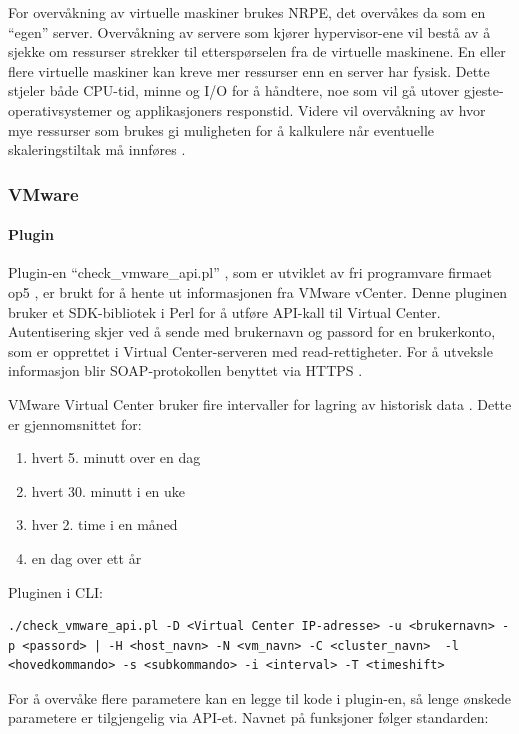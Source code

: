 For overvåkning av virtuelle maskiner brukes NRPE, det overvåkes da som en ``egen'' server. Overvåkning av servere som kjører hypervisor-ene vil bestå av å sjekke om ressurser strekker til etterspørselen fra de virtuelle maskinene. En eller flere virtuelle maskiner kan kreve mer ressurser enn en server har fysisk. Dette stjeler både CPU-tid, minne og I/O for å håndtere, noe som vil gå utover gjeste-operativsystemer og applikasjoners responstid. Videre vil overvåkning av hvor mye ressurser som brukes gi muligheten for å kalkulere når eventuelle skaleringstiltak må innføres \cite{vmwaremonitoring}.

\subsubsection{VMware}
\paragraph{Plugin}
Plugin-en ``check\_vmware\_api.pl'' , som er utviklet av fri programvare firmaet op5 \cite{op5}, er brukt for å hente ut informasjonen fra VMware vCenter. Denne pluginen bruker et SDK-bibliotek i Perl \cite{vmwareperl} for å utføre API-kall til Virtual Center. Autentisering skjer ved å sende med brukernavn og passord for en brukerkonto, som er opprettet i Virtual Center-serveren med read-rettigheter. For å utveksle informasjon blir SOAP-protokollen benyttet \cite{wiki:soap} via HTTPS \cite{ciscovirtual}.

VMware Virtual Center bruker fire intervaller for lagring av historisk data \cite{vmwareperf}. Dette er gjennomsnittet for:
\begin{enumerate}
        \item hvert 5. minutt over en dag
        \item hvert 30. minutt i en uke
        \item hver 2. time i en måned
        \item en dag over ett år
\end{enumerate}

Pluginen i CLI:
\begin{lstlisting}[style=example]
./check_vmware_api.pl -D <Virtual Center IP-adresse> -u <brukernavn> -p <passord> | -H <host_navn> -N <vm_navn> -C <cluster_navn>  -l <hovedkommando> -s <subkommando> -i <interval> -T <timeshift>
\end{lstlisting}

For å overvåke flere parametere kan en legge til kode i plugin-en, så lenge ønskede parametere er tilgjengelig via API-et. Navnet på funksjoner følger standarden:

